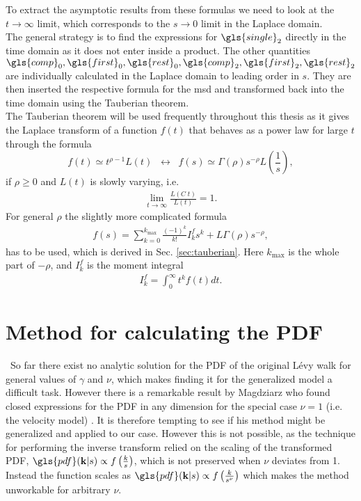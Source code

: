 To extract the asymptotic results from these formulas we need to look at the $t \to \infty$ limit, which corresponds to the $s \to 0$ limit in the Laplace domain. \\
The general strategy is to find the expressions for $\gls{single}_2$ directly in the time domain as it does not enter inside a product. The other quantities $\gls{comp}_0, \gls{first}_0, \gls{rest}_0, \gls{comp}_2, \gls{first}_2, \gls{rest}_2$ are individually calculated in the Laplace domain to leading order in $s$. They are then inserted the respective formula for the \gls{msd} and transformed back into the time domain using the Tauberian theorem. \\
The Tauberian theorem will be used frequently throughout this thesis as it gives the Laplace transform of a function $f(t)$ that behaves as a power law for large $t$ through the formula
% 
\begin{equation}
 f(t) \simeq t^{\rho-1} L(t) \;\; \leftrightarrow \;\; f(s) \simeq \Gamma(\rho) s^{-\rho} L\left(\frac{1}{s}\right) \label{eqn:tauberian} ,
\end{equation}
%
if $\rho \geq 0 $ and $L(t)$ is slowly varying, i.e.
%
\begin{align}
\lim_{t \to \infty} \frac{L(C \; t)}{L(t)} = 1 .
\end{align}
%
For general $\rho$ the slightly more complicated formula 
%
\begin{align}
 f(s) = \sum_{k=0}^{k_{\max}} \frac{(-1)^k}{k!} I^{f}_k s^k + L \Gamma(\rho) s^{-\rho} ,
 \label{eqn:generalTauberian}
\end{align}
%
has to be used, which is derived in Sec. \ref{sec:tauberian}. Here $k_{\max}$ is the whole part of $-\rho$, and $I^{f}_k$ is the moment integral
%
\begin{align}
I^{f}_k = \int_0^\infty t^k f(t) dt.
\end{align}



\section{Method for calculating the PDF}

{\color{blue} \
So far there exist no analytic solution for the \gls{PDF} of the original L\'evy walk for general values of $\gamma$ and $\nu$, which makes finding it for the generalized model a difficult task.
} 
However there is a remarkable result by Magdziarz who found closed expressions for the \gls{PDF} in any dimension for the special case $\nu=1$ (i.e. the velocity model) \cite{magdziarz2015, magdziarz2016}. It is therefore tempting to see if his method might be generalized and applied to our case. However this is not possible, as the technique for performing the inverse transform relied on the scaling of the transformed \gls{PDF}, $\gls{pdf}(\ve{k}|s) \propto f\left( \frac{k}{s} \right)$, which is not preserved when $\nu$ deviates from 1. Instead the function scales as $\gls{pdf}(\ve{k}|s) \propto f\left(\frac{k}{s^{\nu}} \right)$ which makes the method unworkable for arbitrary $\nu$.\\

